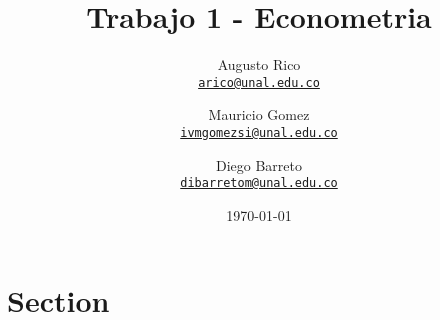 \documentclass[11pt]{article}
\title{Trabajo 1 - Econometria
}
\author{Augusto Rico\\%
    \href{mailto:arico@unal.edu.co}{\texttt{arico@unal.edu.co}} %
\and Mauricio Gomez\\%
    \href{mailto:ivmgomezsi@unal.edu.co}{\texttt{ivmgomezsi@unal.edu.co}} %
\and Diego Barreto\\%
    \href{mailto:dibarretom@unal.edu.co}{\texttt{dibarretom@unal.edu.co}}%
    }
\date{\today}
\begin{document}
\maketitle


\section{Section}
\begin{flushleft}
    
\end{flushleft}


\newpage

\medskip

 

\newpage
\end{document}
